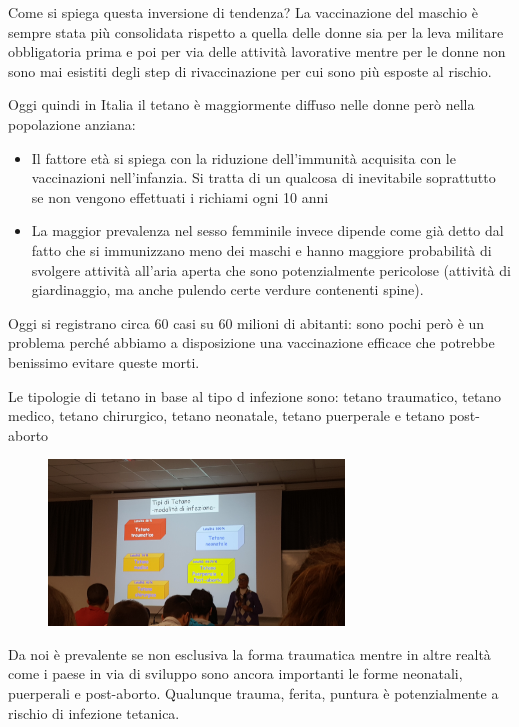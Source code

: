   Come si spiega questa inversione di tendenza? La vaccinazione del
  maschio è sempre stata più consolidata rispetto a quella delle donne
  sia per la leva militare obbligatoria prima e poi per via delle
  attività lavorative mentre per le donne non sono mai esistiti degli
  step di rivaccinazione per cui sono più esposte al rischio.

  Oggi quindi in Italia il tetano è maggiormente diffuso nelle donne
  però nella popolazione anziana:

\begin{itemize}
\item
  Il fattore età si spiega con la riduzione dell'immunità acquisita con
  le vaccinazioni nell'infanzia. Si tratta di un qualcosa di inevitabile
  soprattutto se non vengono effettuati i richiami ogni 10 anni
\item
  La maggior prevalenza nel sesso femminile invece dipende come già
  detto dal fatto che si immunizzano meno dei maschi e hanno maggiore
  probabilità di svolgere attività all'aria aperta che sono
  potenzialmente pericolose (attività di giardinaggio, ma anche pulendo
  certe verdure contenenti spine).
\end{itemize}
  Oggi si registrano circa 60 casi su 60 milioni di abitanti: sono pochi
  però è un problema perché abbiamo a disposizione una vaccinazione
  efficace che potrebbe benissimo evitare queste morti.

  Le tipologie di tetano in base al tipo d infezione sono: tetano
  traumatico, tetano medico, tetano chirurgico, tetano neonatale, tetano
  puerperale e tetano post-aborto

   \begin{figure}[!ht]
\centering
\includegraphics[width=0.7\textwidth]{06/image7.jpeg}
\end{figure}

  Da noi è prevalente se non esclusiva la forma traumatica mentre in
  altre realtà come i paese in via di sviluppo sono ancora importanti le
  forme neonatali, puerperali e post-aborto. Qualunque trauma, ferita,
  puntura è potenzialmente a rischio di infezione tetanica.

